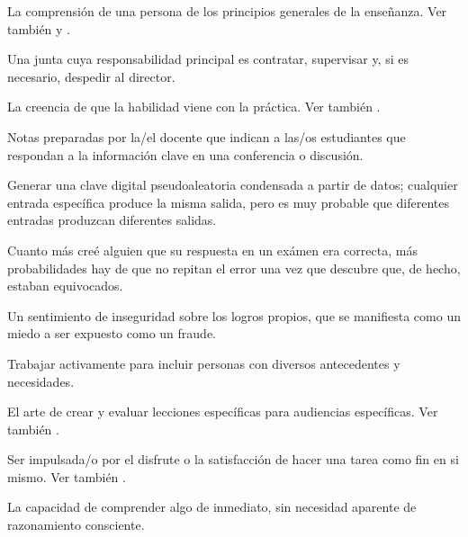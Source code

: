 \begin{description}
 La 
comprensión de una persona de los principios generales de la enseñanza. Ver también
y .



 Una junta cuya responsabilidad principal es
contratar, supervisar y, si es necesario, despedir al director.

 La creencia de que la habilidad 
viene con la práctica. Ver también .

 Notas preparadas por la/el docente que indican a las/os 
estudiantes que respondan a la información clave en una conferencia o discusión.

 Generar una clave digital pseudoaleatoria condensada a partir de datos; cualquier entrada específica produce la misma salida, pero es muy probable que diferentes entradas produzcan diferentes salidas.

 Cuanto más creé alguien 
que su respuesta en un exámen era correcta, más probabilidades hay de que no 
repitan el error una vez que descubre que, de hecho, estaban equivocados.



 Un sentimiento de inseguridad sobre 
los logros propios, que se manifiesta como un miedo a ser expuesto como un fraude.

 Trabajar activamente para incluir 
personas con diversos antecedentes y necesidades.



 El arte de crear y evaluar 
lecciones específicas para audiencias específicas. Ver también
.



 Ser impulsada/o por el disfrute o 
la satisfacción de hacer una tarea como fin en si mismo.  Ver también
.

 La capacidad de comprender algo de inmediato, 
sin necesidad aparente de razonamiento consciente.


\end{description}
